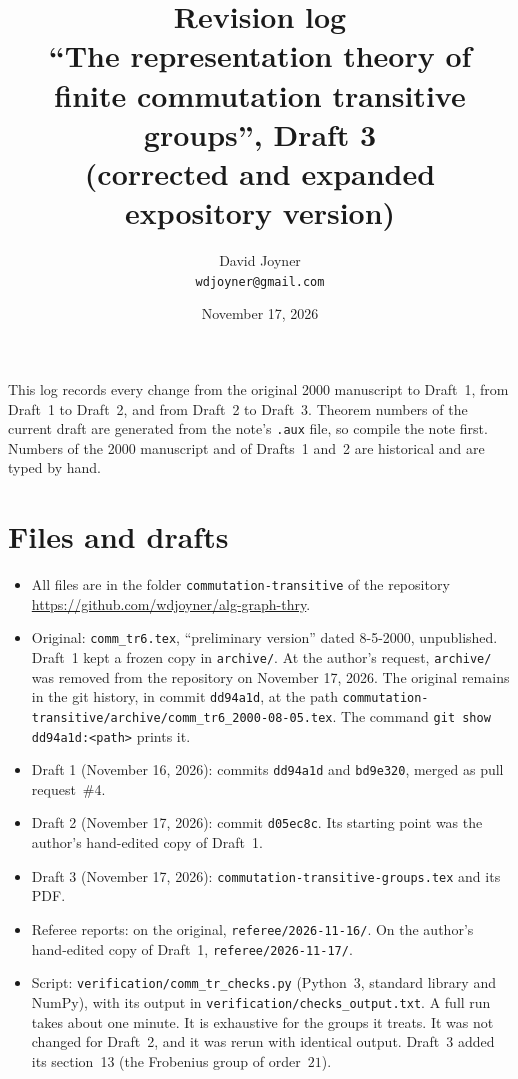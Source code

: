 \documentclass[12pt,letterpaper]{article}
\title{Revision log\\[4pt]\large ``The representation theory of finite
commutation transitive groups'', Draft 3\\(corrected and expanded expository
version)}
\author{David Joyner\\\texttt{wdjoyner@gmail.com}}
\date{November 17, 2026}
\begin{document}
\maketitle

\noindent This log records every change from the original 2000 manuscript
to Draft~1, from Draft~1 to Draft~2, and from Draft~2 to Draft~3. Theorem numbers of the current draft
are generated from the note's \texttt{.aux} file, so compile the note first.
Numbers of the 2000 manuscript and of Drafts~1 and~2 are historical and are
typed by hand.

\section{Files and drafts}\label{sec:files}

\begin{itemize}[itemsep=1pt]
\item All files are in the folder \texttt{commutation-transitive} of the
  repository \url{https://github.com/wdjoyner/alg-graph-thry}.
\item Original: \texttt{comm\_tr6.tex}, ``preliminary version'' dated
  8-5-2000, unpublished. Draft~1 kept a frozen copy in \texttt{archive/}. At
  the author's request, \texttt{archive/} was removed from the repository on
  November 17, 2026. The original remains in the git history, in commit
  \texttt{dd94a1d}, at the path
  \nolinkurl{commutation-transitive/archive/comm_tr6_2000-08-05.tex}. The
  command \texttt{git show dd94a1d:<path>} prints it.
\item Draft 1 (November 16, 2026): commits \texttt{dd94a1d} and
  \texttt{bd9e320}, merged as pull request~\#4.
\item Draft 2 (November 17, 2026): commit \texttt{d05ec8c}. Its starting
  point was the author's hand-edited copy of Draft~1.
\item Draft 3 (November 17, 2026): \texttt{commutation-transitive-groups.tex}
  and its PDF.
\item Referee reports: on the original, \texttt{referee/2026-11-16/}. On the
  author's hand-edited copy of Draft~1, \texttt{referee/2026-11-17/}.
\item Script: \texttt{verification/comm\_tr\_checks.py} (Python~3, standard
  library and NumPy), with its output in
  \texttt{verification/checks\_output.txt}. A full run takes about one
  minute. It is exhaustive for the groups it treats. It was not changed for
  Draft~2, and it was rerun with identical output. Draft~3 added its
  section~13 (the Frobenius group of order~$21$).
\end{itemize}
\end{document}
